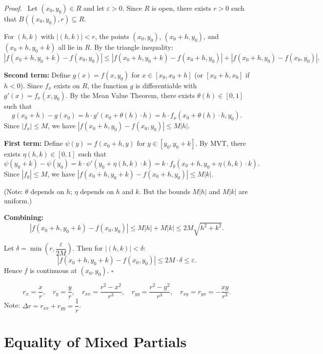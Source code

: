 \documentclass[11pt]{report}
\renewenvironment{proof}[1][Proof]{\par\noindent\textit{#1.}\ }{\hfill$\square$\par\medskip}
\newcommand{\eps}{\varepsilon}
\begin{document}
\begin{proof}
Let $(x_0, y_0) \in R$ and let $\eps > 0$. Since $R$ is open, there exists $r > 0$ such that $B((x_0, y_0), r) \subseteq R$.

For $(h, k)$ with $|(h, k)| < r$, the points $(x_0, y_0)$, $(x_0 + h, y_0)$, and $(x_0 + h, y_0 + k)$ all lie in $R$. By the triangle inequality:
\[
|f(x_0 + h, y_0 + k) - f(x_0, y_0)| \leq |f(x_0 + h, y_0 + k) - f(x_0 + h, y_0)| + |f(x_0 + h, y_0) - f(x_0, y_0)|.
\]

\textbf{Second term:} Define $g(x) = f(x, y_0)$ for $x \in [x_0, x_0 + h]$ (or $[x_0 + h, x_0]$ if $h < 0$). Since $f_x$ exists on $R$, the function $g$ is differentiable with $g'(x) = f_x(x, y_0)$. By the Mean Value Theorem, there exists $\theta(h) \in [0, 1]$ such that
\[
g(x_0 + h) - g(x_0) = h \cdot g'(x_0 + \theta(h) \cdot h) = h \cdot f_x(x_0 + \theta(h) \cdot h, y_0).
\]
Since $|f_x| \leq M$, we have $|f(x_0 + h, y_0) - f(x_0, y_0)| \leq M|h|$.

\textbf{First term:} Define $\psi(y) = f(x_0 + h, y)$ for $y \in [y_0, y_0 + k]$. By MVT, there exists $\eta(h, k) \in [0, 1]$ such that
\[
\psi(y_0 + k) - \psi(y_0) = k \cdot \psi'(y_0 + \eta(h,k) \cdot k) = k \cdot f_y(x_0 + h, y_0 + \eta(h,k) \cdot k).
\]
Since $|f_y| \leq M$, we have $|f(x_0 + h, y_0 + k) - f(x_0 + h, y_0)| \leq M|k|$.

(Note: $\theta$ depends on $h$; $\eta$ depends on $h$ and $k$. But the bounds $M|h|$ and $M|k|$ are uniform.)

\textbf{Combining:} 
\[
|f(x_0 + h, y_0 + k) - f(x_0, y_0)| \leq M|h| + M|k| \leq 2M\sqrt{h^2 + k^2}.
\]

Let $\delta = \min\left(r, \dfrac{\eps}{2M}\right)$. Then for $|(h, k)| < \delta$:
\[
|f(x_0 + h, y_0 + k) - f(x_0, y_0)| \leq 2M \cdot \delta \leq \eps.
\]
Hence $f$ is continuous at $(x_0, y_0)$.
\end{proof}

\begin{example}[Second Partials of $r = \sqrt{x^2 + y^2}$]
\[
r_x = \frac{x}{r}, \quad r_y = \frac{y}{r}, \quad r_{xx} = \frac{r^2 - x^2}{r^3}, \quad r_{yy} = \frac{r^2 - y^2}{r^3}, \quad r_{xy} = r_{yx} = -\frac{xy}{r^3}.
\]
Note: $\Delta r = r_{xx} + r_{yy} = \dfrac{1}{r}$.
\end{example}

\section{Equality of Mixed Partials}
\end{document}
